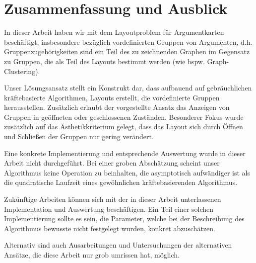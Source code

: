 \chapter{Zusammenfassung und Ausblick}
In dieser Arbeit haben wir mit dem Layoutproblem für Argumentkarten beschäftigt, insbesondere bezüglich vordefinierten Gruppen von Argumenten, d.h. Gruppenzugehörigkeiten sind ein Teil des zu zeichnenden Graphen im Gegensatz zu Gruppen, die als Teil des Layouts bestimmt werden (wie bspw. Graph-Clustering).

Unser Lösungsansatz stellt ein Konstrukt dar, dass aufbauend auf gebräuchlichen kräftebasierte Algorithmen, Layouts erstellt, die vordefinierte Gruppen herausstellen. Zusätzlich erlaubt der vorgestellte Ansatz das Anzeigen von Gruppen in geöffneten oder geschlossenen Zuständen. Besonderer Fokus wurde zusätzlich auf das Ästhetikkriterium gelegt, dass das Layout sich durch Öffnen und Schließen der Gruppen nur gering verändert.

Eine konkrete Implementierung und entsprechende Auswertung wurde in dieser Arbeit nicht durchgeführt.
Bei einer groben Abschätzung scheint unser Algorithmus keine Operation zu beinhalten, die asymptotisch aufwändiger ist als die quadratische Laufzeit eines gewöhnlichen kräftebasierenden Algorithmus.

Zukünftige Arbeiten können sich mit der in dieser Arbeit unterlassenen Implementation und Auswertung beschäftigen. Ein Teil einer solchen Implementierung sollte es sein, die Parameter, welche bei der Beschreibung des Algorithmus bewusste nicht festgelegt wurden, konkret abzuschätzen.

Alternativ sind auch Ausarbeitungen und Untersuchungen der alternativen Ansätze, die diese Arbeit nur grob umrissen hat, möglich.

